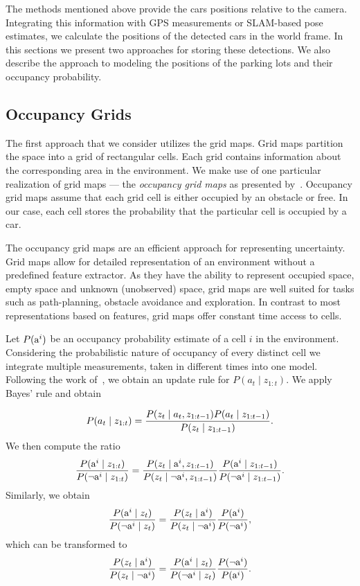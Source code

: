The methods mentioned above provide the cars positions relative to the camera.
Integrating this information with GPS measurements or SLAM-based pose
estimates, we calculate the positions of the detected cars in the world frame.
In this sections we present two approaches for storing these detections. We
also describe the approach to modeling the positions of the parking lots and
their occupancy probability.

\subsection{Occupancy Grids}
\label{sub:occupancy_grids}

The first approach that we consider utilizes the grid maps. Grid maps
partition the space into a grid of rectangular cells. Each grid contains
information about the corresponding area in the environment. We make use of
one particular realization of grid maps --- the \emph{occupancy grid maps} as
presented by~\citet{occupancy_grids}. Occupancy grid maps assume that each
grid cell is either occupied by an obstacle or free. In our case, each cell
stores the probability that the particular cell is occupied by a car.

The occupancy grid maps are an efficient approach for representing
uncertainty. Grid maps allow for detailed representation of an environment
without a predefined feature extractor. As they have the ability to represent
occupied space, empty space and unknown (unobserved) space, grid maps are well
suited for tasks such as path-planning, obstacle avoidance and exploration. In
contrast to most representations based on features, grid maps offer constant
time access to cells.

Let $P({\mbox{a}^i})$ be an occupancy probability estimate of a cell $i$ in the
environment. Considering the probabilistic nature of occupancy of every
distinct cell we integrate multiple measurements, taken in different times
into one model. Following the work of~\citet{occupancy_grids}, we obtain an
update rule for $P(a_t\mid z_{1:t})$. We apply Bayes' rule and obtain

\begin{equation}
P(a_t \mid  z_{1:t} ) = \frac{P(z_t \mid a_t, z_{1:t-1}) P(a_t \mid z_{1:t-1})}{P(z_t \mid z_{1:t-1})}.
\end{equation}
\noindent
We then compute the ratio
\begin{equation}
\frac{P({\mbox{a}^i}\mid z_{1:t})}{P(\neg{\mbox{a}^i} \mid z_{1:t})}
=
\frac{P(z_{t} \mid {\mbox{a}^i}, z_{1:t-1})}{P(z_{t} \mid \neg{\mbox{a}^i}, z_{1:t-1})}   \frac{P({\mbox{a}^i}\mid z_{1:t-1})}{ P(\neg{\mbox{a}^i}\mid z_{1:t-1})}.
\end{equation}
\noindent
Similarly, we obtain
\begin{equation}
\nonumber
\frac{P({\mbox{a}^i}\mid z_{t})}{P(\neg{\mbox{a}^i} \mid z_{t})} = \frac{P(z_{t} \mid {\mbox{a}^i})}{P(z_{t} \mid \neg{\mbox{a}^i})}   \frac{P({\mbox{a}^i})}{ P(\neg{\mbox{a}^i})},
\end{equation}
\noindent
which can be transformed to
\begin{equation}
\frac{P(z_{t} \mid {\mbox{a}^i})}{P(z_{t} \mid \neg{\mbox{a}^i})}
=
\frac{P({\mbox{a}^i} \mid z_{t})}{P(\neg{\mbox{a}^i} \mid z_{t})}   \frac{P(\neg{\mbox{a}^i})}{ P({\mbox{a}^i})}.
\end{equation}
\noindent


